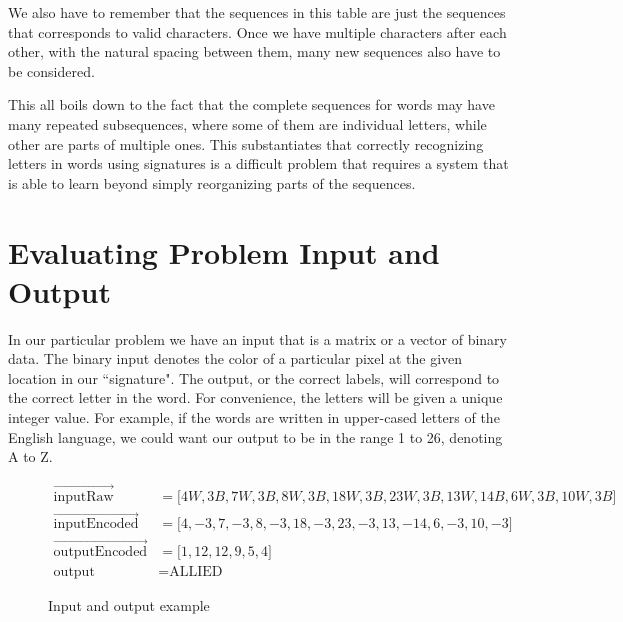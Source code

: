 We also have to remember that the sequences in this table are just the sequences that corresponds to valid characters. Once we have multiple characters after each other, with the natural spacing between them, many new sequences also have to be considered. 

This all boils down to the fact that the complete sequences for words may have many repeated subsequences, where some of them are individual letters, while other are parts of multiple ones. This substantiates that correctly recognizing letters in words using signatures is a difficult problem that requires a system that is able to learn beyond simply reorganizing parts of the sequences.


\section{Evaluating Problem Input and Output}
\label{sec:evaluating_problem_input_and_output}
In our particular problem we have an input that is a matrix or a vector of binary data. The binary input denotes the color of a particular pixel at the given location in our ``signature". The output, or the correct labels, will correspond to the correct letter in the word. For convenience, the letters will be given a unique integer value. For example, if the words are written in upper-cased letters of the English language, we could want our output to be in the range 1 to 26, denoting A to Z.

\begin{figure}[h]
    \begin{equation}
        \label{eq:input_output_example}
        \begin{aligned}
           \vec{\text{inputRaw}}               &= \lbrack 4W, 3B, 7W, 3B, 8W, 3B, 18W, 3B, 23W, 3B, 13W, 14B, 6W, 3B, 10W, 3B \rbrack \\
           \vec{\text{inputEncoded}}           &= \lbrack 4, -3, 7, -3, 8, -3, 18, -3, 23, -3, 13, -14, 6, -3, 10, -3 \rbrack \\
           \vec{\text{outputEncoded}}          &= \lbrack 1, 12, 12, 9, 5, 4 \rbrack \\
           \text{output}                       &= \text{ALLIED}
        \end{aligned}
    \end{equation}
    \captionsetup{labelformat=empty}
    \caption{Input and output example}
\end{figure}

